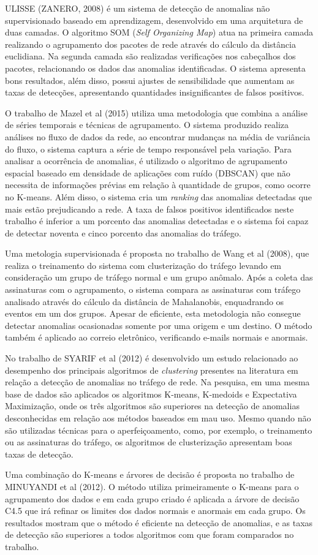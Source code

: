 \indent ULISSE (ZANERO, 2008) é um sistema de detecção de anomalias não supervisionado baseado em aprendizagem, desenvolvido em uma arquitetura de duas camadas. O algoritmo SOM (\textit{Self Organizing Map}) atua na primeira camada realizando o agrupamento dos pacotes de rede através do cálculo da distância euclidiana. Na segunda camada são realizadas verificações nos cabeçalhos dos pacotes, relacionando os dados das anomalias identificadas. O sistema apresenta bons resultados, além disso, possui ajustes de sensibilidade que aumentam as taxas de detecções, apresentando quantidades insignificantes de falsos positivos.

\indent O trabalho de Mazel et al (2015) utiliza uma metodologia que combina a análise de séries temporais e técnicas de agrupamento. O sistema produzido realiza análises no fluxo de dados da rede, ao encontrar mudanças na média de variância do fluxo, o sistema captura a série de tempo responsável pela variação. Para analisar a ocorrência de anomalias, é utilizado o algoritmo de agrupamento espacial baseado em densidade de aplicações com ruído (DBSCAN) que não necessita de informações prévias em relação à quantidade de grupos, como ocorre no K-means. Além disso, o sistema cria um \textit{ranking} das anomalias detectadas que mais estão prejudicando a rede. A taxa de falsos positivos identificados neste trabalho é inferior a um porcento das anomalias detectadas e o sistema foi capaz de detectar noventa e cinco porcento das anomalias do tráfego.

\indent Uma metologia supervisionada é proposta no trabalho de Wang et al (2008), que realiza o treinamento do sistema com clusterização do tráfego levando em consideração um grupo de tráfego normal e um grupo anômalo. Após a coleta das assinaturas com o agrupamento, o sistema compara as assinaturas com tráfego analisado através do cálculo da distância de Mahalanobis, enquadrando os eventos em um dos grupos. Apesar de eficiente, esta metodologia não consegue detectar anomalias ocasionadas somente por uma origem e um destino. O método também é aplicado ao correio eletrônico, verificando e-mails normais e anormais.

\indent No trabalho de SYARIF et al (2012) é desenvolvido um estudo relacionado ao desempenho dos principais algoritmos de \textit{clustering} presentes na literatura em relação a detecção de anomalias no tráfego de rede. Na pesquisa, em uma mesma base de dados são aplicados os algoritmos K-means, K-medoids e Expectativa Maximização, onde os três algoritmos são superiores na detecção de anomalias desconhecidas em relação aos métodos baseados em mau uso. Mesmo quando não são utilizadas técnicas para o aperfeiçoamento, como, por exemplo, o treinamento ou as assinaturas do tráfego, os algoritmos de clusterização apresentam boas taxas de detecção.

\indent Uma combinação do K-means e árvores de decisão é proposta no trabalho de MINUYANDI et al (2012). O método utiliza primeiramente o K-means para o agrupamento dos dados e em cada grupo criado é aplicada a árvore de decisão C4.5 que irá refinar os limites dos dados normais e anormais em cada grupo. Os resultados mostram que o método é eficiente na detecção de anomalias, e as taxas de detecção são superiores a todos algoritmos com que foram comparados no trabalho.
